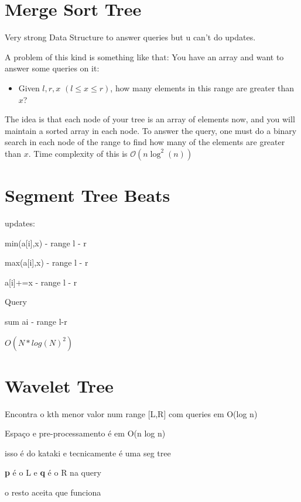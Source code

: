     

    \section{Merge Sort Tree}

    Very strong Data Structure to answer queries but u can't do updates.

    A problem of this kind is something like that: You have an array and want to answer some queries on it:
    \begin{itemize}
        \item Given $l, r, x$ $(l \le x \le r)$, how many elements in this range are greater than $x$?
    \end{itemize}

    The idea is that each node of your tree is an array of elements now, and you will maintain a sorted array in each node. To answer the query, one must do a binary search in each node of the range to find how many of the elements are greater than $x$. Time complexity of this is $\mathcal{O}(n\log^2(n))$

      
    
    \section{Segment Tree Beats}
    updates:
    
    min(a[i],x) - range l - r
    
    max(a[i],x) - range l - r
    
    a[i]+=x - range l - r
    
    Query
    
    sum ai - range l-r
    
    $O(N*log(N)^2)$
    
    \section{Wavelet Tree}
    Encontra o kth menor valor num range [L,R] com queries em O(log n)
    
    Espaço e pre-processamento é em O(n log n)
    
    isso é do kataki e tecnicamente é uma seg tree
    
    \textbf{p} é o L e \textbf{q} é o R na query
    
    o resto aceita que funciona
    
    